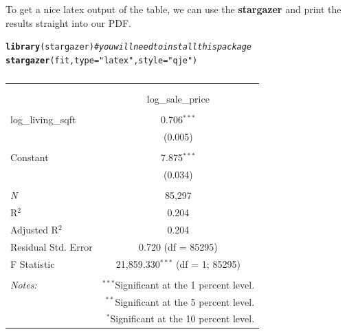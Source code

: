 \documentclass[10pt]{article}\usepackage[]{graphicx}\usepackage[]{color}
\makeatletter
\newcommand{\hlstr}[1]{\textcolor[rgb]{0.192,0.494,0.8}{#1}}%
\newcommand{\hlcom}[1]{\textcolor[rgb]{0.678,0.584,0.686}{\textit{#1}}}%
\newcommand{\hlstd}[1]{\textcolor[rgb]{0.345,0.345,0.345}{#1}}%
\newcommand{\hlkwc}[1]{\textcolor[rgb]{0.333,0.667,0.333}{#1}}%
\newcommand{\hlkwd}[1]{\textcolor[rgb]{0.737,0.353,0.396}{\textbf{#1}}}%
\newenvironment{kframe}{%
 \def\at@end@of@kframe{}%
 \ifinner\ifhmode%
  \def\at@end@of@kframe{\end{minipage}}%
  \begin{minipage}{\columnwidth}%
 \fi\fi%
 \def\FrameCommand##1{\hskip\@totalleftmargin \hskip-\fboxsep
 \colorbox{shadecolor}{##1}\hskip-\fboxsep
     \hskip-\linewidth \hskip-\@totalleftmargin \hskip\columnwidth}%
 \MakeFramed {\advance\hsize-\width
   \@totalleftmargin\z@ \linewidth\hsize
   \@setminipage}}%
 {\par\unskip\endMakeFramed%
 \at@end@of@kframe}
\makeatother
\begin{document}
To get a nice latex output of the table, we can use the { \bf stargazer } and print the results straight into our PDF.

\begin{kframe}
\begin{alltt}
\hlkwd{library}\hlstd{(stargazer)} \hlcom{# you will need to install this package}
\hlkwd{stargazer}\hlstd{(fit,}\hlkwc{type}\hlstd{=}\hlstr{"latex"}\hlstd{,}\hlkwc{style}\hlstd{=}\hlstr{"qje"}\hlstd{)}
\end{alltt}
\end{kframe}
\begin{table}[!htbp] \centering 
  \caption{} 
  \label{} 
\begin{tabular}{@{\extracolsep{5pt}}lc} 
\\[-1.8ex]\hline 
\hline \\[-1.8ex] 
\\[-1.8ex] & log\_sale\_price \\ 
\hline \\[-1.8ex] 
 log\_living\_sqft & 0.706$^{***}$ \\ 
  & (0.005) \\ 
  & \\ 
 Constant & 7.875$^{***}$ \\ 
  & (0.034) \\ 
  & \\ 
\textit{N} & 85,297 \\ 
R$^{2}$ & 0.204 \\ 
Adjusted R$^{2}$ & 0.204 \\ 
Residual Std. Error & 0.720 (df = 85295) \\ 
F Statistic & 21,859.330$^{***}$ (df = 1; 85295) \\ 
\hline 
\hline \\[-1.8ex] 
\textit{Notes:} & \multicolumn{1}{r}{$^{***}$Significant at the 1 percent level.} \\ 
 & \multicolumn{1}{r}{$^{**}$Significant at the 5 percent level.} \\ 
 & \multicolumn{1}{r}{$^{*}$Significant at the 10 percent level.} \\ 
\end{tabular} 
\end{table} 







\newpage



\end{document}

